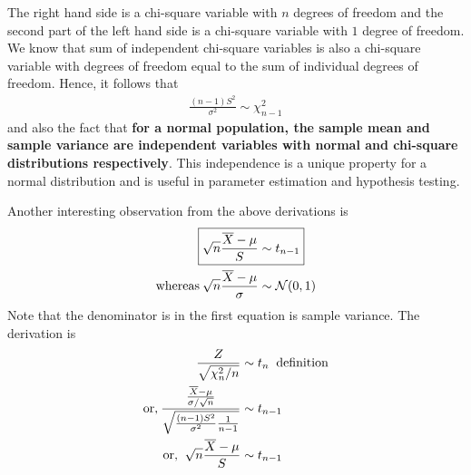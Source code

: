 \documentclass[../probability-notes.tex]{subfiles}
\begin{document}
    The right hand side is a chi-square variable with $n$ degrees of freedom and the second part of the left hand side is a chi-square variable with $1$ degree of freedom. We know that sum of independent chi-square variables is also a chi-square variable with degrees of freedom equal to the sum of individual degrees of freedom. Hence, it follows that
    \begin{align*}
        \frac{(n-1)S^{2}}{\sigma^{2}} \sim \chi_{n-1}^{2}
    \end{align*}
    and also the fact that \textbf{for a normal population, the sample mean and sample variance are independent variables with normal and chi-square distributions respectively}. This independence is a unique property for a normal distribution and is useful in parameter estimation and hypothesis testing.\newline

    Another interesting observation from the above derivations is
    \begin{align*}
        \Aboxed{\sqrt{n}\frac{\overline{X} - \mu}{S} &\sim t_{n-1}}\\
        \text{whereas\:} \sqrt{n}\frac{\overline{X} - \mu}{\sigma} &\sim \mathcal{N}(0,1)
    \end{align*}
    Note that the denominator is in the first equation is sample variance. The derivation is
    \begin{align*}
        \frac{Z}{\sqrt{\chi_{n}^{2}/n}} &\sim t_{n} \text{\: definition}\\
        \text{or,\:} \frac{\frac{\overline{X} - \mu}{\sigma / \sqrt{n}}}{\sqrt{\frac{(n-1)S^{2}}{\sigma^{2}} \frac{1}{n-1}}} &\sim t_{n-1}\\
        \text{or, \:} \sqrt{n}\frac{\overline{X} - \mu}{S} &\sim t_{n-1}
    \end{align*}
\end{document}
